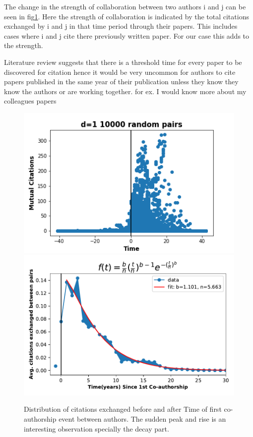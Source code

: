 \documentclass[aps, pre, twocolumn, nofootinbib]{revtex4-1}
\begin{document}
The change in the strength of collaboration between two authors i and j can be seen in fig\ref{f4}. Here the strength of collaboration is indicated by the total citations exchanged by i and j in that time period through their papers. This includes cases where i and j cite there previously written paper. For our case this adds to the strength. 

{\color{red}Literature review suggests that there is a threshold time for every paper to be discovered for citation hence it would be very uncommon for authors to cite papers published in the same year of their publication unless they know they know the authors or are working together. for ex. I would know more about my colleagues papers}



\begin{figure}[htbp]  
	\centering
	
	\includegraphics[scale = 0.49]{plots/d1}
	\includegraphics[scale = 0.49]{plots/aging_in_colab}
		
\captionsetup{singlelinecheck=false, justification=raggedright,  labelsep=space}
\caption{Distribution of citations exchanged before and after Time of first co-authorship event between authors. The sudden peak and rise is an interesting observation specially the decay part.}
   \label{f4}
\end{figure}
\end{document}
